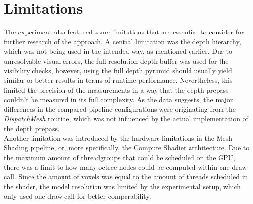 










\section{Limitations}

The experiment also featured some limitations that are essential to consider for further research of the approach.
A central limitation was the depth hierarchy, which was not being used in the intended way, as mentioned earlier.
Due to unresolvable visual errors, the full-resolution depth buffer was used for the visibility checks, however, 
using the full depth pyramid should usually yield similar or better results in terms of runtime performance. 
Nevertheless, this limited the precision of the measurements in a way that the depth prepass couldn't be measured 
in its full complexity. As the data suggests, the major differences in the compared pipeline configurations were 
originating from the \emph{DispatchMesh} routine, which was not influenced by the actual implementation of the 
depth prepass. \\

\noindent
Another limitation was introduced by the hardware limitations in the Mesh Shading pipeline, or, more specifically, the 
Compute Shadier architecture. Due to the maximum amount of threadgroups that could be scheduled on the \ac{GPU}, there 
was a limit to how many octree nodes could be computed within one draw call. Since the amount of voxels was equal to the 
amount of threads scheduled in the shader, the model resolution was limited by the experimental setup, which only used 
one draw call for better comparability. \\

